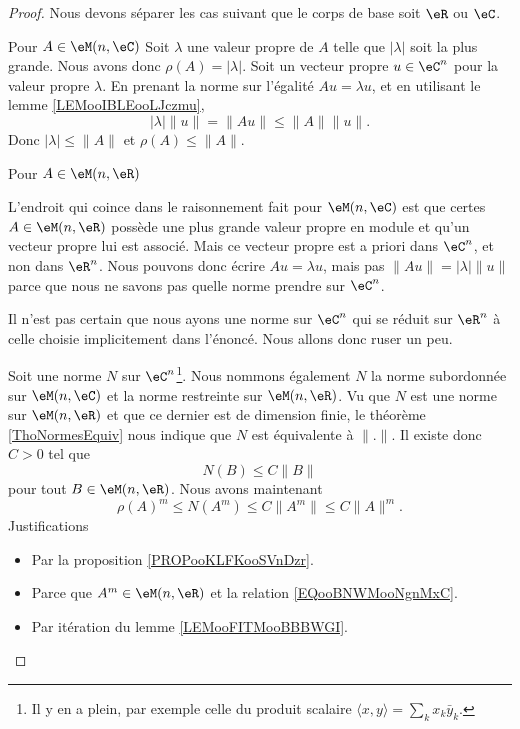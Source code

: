\begin{proof}
    Nous devons séparer les cas suivant que le corps de base soit \( \eR\) ou \( \eC\).

    \begin{subproof}
        \item[Pour \( A\in \eM(n,\eC)\)]
            Soit \( \lambda\) une valeur propre de \( A\) telle que \( | \lambda |\) soit la plus grande. Nous avons donc \( \rho(A)=| \lambda |\). Soit un vecteur propre \( u\in \eC^n\) pour la valeur propre \( \lambda\). En prenant la norme sur l'égalité \( Au=\lambda u\), et en utilisant le lemme \ref{LEMooIBLEooLJczmu},
            \begin{equation}
                | \lambda |\| u \|=\| Au \|\leq \| A \|\| u \|.
            \end{equation}
            Donc \( | \lambda |\leq \| A \|\) et \( \rho(A)\leq\| A \|\).

        \item[Pour \( A\in \eM(n,\eR)\)]

            L'endroit qui coince dans le raisonnement fait pour \( \eM(n,\eC)\) est que certes \( A\in \eM(n,\eR)\) possède une plus grande valeur propre en module et qu'un vecteur propre lui est associé. Mais ce vecteur propre est a priori dans \( \eC^n\), et non dans \( \eR^n\). Nous pouvons donc écrire \( Au=\lambda u\), mais pas \( \| Au \|=| \lambda |\| u \|\) parce que nous ne savons pas quelle norme prendre sur \( \eC^n\).

            Il n'est pas certain que nous ayons une norme sur \( \eC^n\) qui se réduit sur \( \eR^n\) à celle choisie implicitement dans l'énoncé. Nous allons donc ruser un peu.

            Soit une norme \( N\) sur \( \eC^n\)\footnote{Il y en a plein, par exemple celle du produit scalaire \( \langle x, y\rangle =\sum_kx_k\bar y_k\).}. Nous nommons également \( N\) la norme subordonnée sur \( \eM(n,\eC)\) et la norme restreinte sur \( \eM(n,\eR)\). Vu que \( N\) est une norme sur \( \eM(n,\eR)\) et que ce dernier est de dimension finie, le théorème \ref{ThoNormesEquiv} nous indique que \( N\) est équivalente à \( \| . \|\). Il existe donc \( C>0\) tel que
            \begin{equation}        \label{EQooBNWMooNgnMxC}
                 N(B)\leq C\| B \|
            \end{equation}
            pour tout \( B\in \eM(n,\eR)\). Nous avons maintenant
            \begin{equation}
                \rho(A)^m\leq N(A^m)\leq C\| A^m \|\leq C\| A \|^m.
            \end{equation}
            Justifications 
            \begin{itemize}
                \item Par la proposition \ref{PROPooKLFKooSVnDzr}.
                \item Parce que \( A^m\in \eM(n,\eR)\) et la relation \eqref{EQooBNWMooNgnMxC}.
                \item Par itération du lemme \ref{LEMooFITMooBBBWGI}.
            \end{itemize}
            

\end{subproof}
\end{proof}
